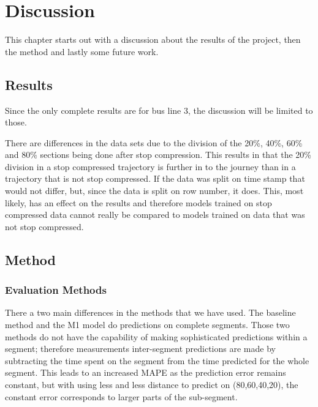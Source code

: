 
\chapter{Discussion}
\label{cha:discussion}

This chapter starts out with a discussion about the results of the project, then the method and lastly some future work.

\section{Results}
\label{sec:discussion-results} 
Since the only complete results are for bus line 3, the discussion will be limited to those. 

There are differences in the data sets due to the division of the 20\%, 40\%, 60\% and 80\% sections being done after stop compression. This results in that the 20\% division in a stop compressed trajectory is further in to the journey than in a trajectory that is not stop compressed. If the data was split on time stamp that would not differ, but, since the data is split on row number, it does. This, most likely, has an effect on the results and therefore models trained on stop compressed data cannot really be compared to models trained on data that was not stop compressed.

\section{Method}
\label{sec:discussion-method}
\subsection{Evaluation Methods}
There a two main differences in the methods that we have used. The baseline method and the M1 model do predictions on complete segments. Those two methods do not have the capability of making sophisticated predictions within a segment; therefore measurements inter-segment predictions are made by subtracting the time spent on the segment from the time predicted for the whole segment. This leads to an increased MAPE as the prediction error remains constant, but with using less and less distance to predict on (80,60,40,20), the constant error corresponds to larger parts of the sub-segment.

